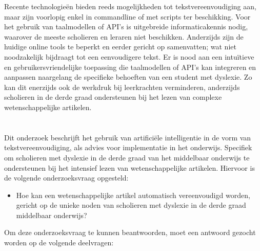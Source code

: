 Recente technologieën bieden reeds mogelijkheden tot tekstvereenvoudiging aan, maar zijn voorlopig enkel in commandline of met scripts ter beschikking. Voor het gebruik van taalmodellen of API's is uitgebreide informaticakennis nodig, waarover de meeste scholieren en leraren niet beschikken. Anderzijds zijn de huidige online tools te beperkt en eerder gericht op samenvatten; wat niet noodzakelijk bijdraagt tot een eenvoudigere tekst. Er is nood aan een intuïtieve en gebruikersvriendelijke toepassing die taalmodellen of API's kan integreren en aanpassen naargelang de specifieke behoeften van een student met dyslexie. Zo kan dit enerzijds ook de werkdruk bij leerkrachten verminderen, anderzijds scholieren in de derde graad ondersteunen bij het lezen van complexe wetenschappelijke artikelen. 

\section{}%
\label{sec:onderzoeksvraag}

Dit onderzoek beschrijft het gebruik van artificiële intelligentie in de vorm van tekstvereenvoudiging, als advies voor implementatie in het onderwijs. Specifiek om scholieren met dyslexie in de derde graad van het middelbaar onderwijs te ondersteunen bij het intensief lezen van wetenschappelijke artikelen. Hiervoor is de volgende onderzoeksvraag opgesteld: 

\begin{itemize}
	\item Hoe kan een wetenschappelijke artikel automatisch vereenvoudigd worden, gericht op de unieke noden van scholieren met dyslexie in de derde graad middelbaar onderwijs?
\end{itemize}

Om deze onderzoeksvraag te kunnen beantwoorden, moet een antwoord gezocht worden op de volgende deelvragen:

